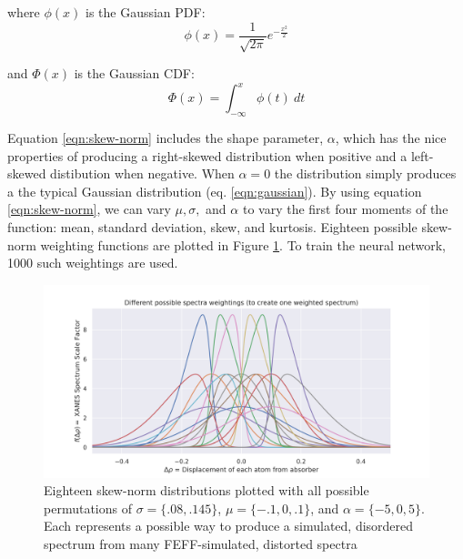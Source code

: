 \noindent
where $ \phi(x) $ is the Gaussian PDF:
\begin{equation}
	\label{eqn:skew-norm-pdf}
	\phi (x)={\frac  {1}{{\sqrt  {2\pi }}}}e^{{-{\frac  {x^{2}}{2}}}}
\end{equation}

\noindent
and $ \Phi (x) $ is the Gaussian CDF:
\begin{equation}
	\label{eqn:skew-norm-cdf}
	\Phi (x)=\int _{{-\infty }}^{{x}}\phi (t)\ dt
\end{equation}



\noindent
Equation \ref{eqn:skew-norm} includes the shape parameter, $ \alpha $, which has the nice properties of producing a right-skewed distribution when positive and a left-skewed distibution when negative. When $ \alpha=0 $ the distribution simply produces a the typical Gaussian distribution (eq. \ref{eqn:gaussian}). By using equation \ref{eqn:skew-norm}, we can vary $ \mu, \sigma,  $ and $ \alpha $ to vary the first four moments of the function: mean, standard deviation, skew, and kurtosis. Eighteen possible skew-norm weighting functions are plotted in Figure \ref{fig:skew-norm-options}. To train the neural network, 1000 such weightings are used.

\begin{figure}[h!]
	\centering
	\includegraphics[width=\linewidth]{Chapters/Figures/skewnorm_options.png}
	\caption[Simulated Disordered Spectrum Weightings]{Eighteen skew-norm distributions plotted with all possible permutations of $ \sigma=\{.08, .145\} $, $ \mu=\{-.1, 0, .1\} $, and $ \alpha=\{-5,0,5\} $. Each represents a possible way to produce a simulated, disordered spectrum from many FEFF-simulated, distorted spectra} 
	\label{fig:skew-norm-options}
\end{figure}

